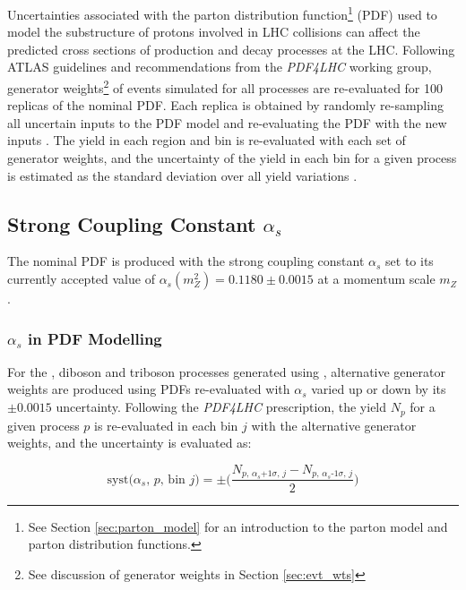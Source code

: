 Uncertainties associated with the parton distribution function\footnote{See Section \ref{sec:parton_model} for an introduction to the parton model and parton distribution functions.} (PDF) used to model the substructure of protons involved in LHC collisions can affect the predicted cross sections of production and decay processes at the LHC. Following ATLAS guidelines and recommendations from the \textit{PDF4LHC} \cite{PDF4LHC_recos_2016} working group, generator weights\footnote{See discussion of generator weights in Section \ref{sec:evt_wts}} of events simulated for all processes are re-evaluated for 100 replicas of the nominal PDF. Each replica is obtained by randomly re-sampling all uncertain inputs to the PDF model and re-evaluating the PDF with the new inputs \cite{BALL20091}. The yield in each region and bin is re-evaluated with each set of generator weights, and the uncertainty of the yield in each bin for a given process is estimated as the standard deviation over all yield variations \cite{PDF4LHC_recos_2016}.

\subsection{Strong Coupling Constant \(\alpha_s\)}

The nominal PDF is produced with the strong coupling constant \(\alpha_s\) set to its currently accepted value of \(\alpha_s(m_Z^2)=0.1180\pm0.0015\) \cite{PDF4LHC_recos_2016} at a momentum scale \(m_Z\). 

\subsubsection{\(\alpha_s\) in PDF Modelling}

For the \wjets, diboson and triboson processes generated using , alternative generator weights are produced using PDFs re-evaluated with \(\alpha_s\) varied up or down by its \(\pm0.0015\) uncertainty. Following the \textit{PDF4LHC} prescription, the yield \(N_p\) for a given process \(p\) is re-evaluated in each bin \(j\) with the alternative generator weights, and the uncertainty is evaluated as:

\begin{equation}
\label{eq:alphas_syst}
\text{syst}\text{(\(\alpha_s\), \(p\), bin \(j\))}= \pm\Bigg(\frac{N_\text{\(p\), \(\alpha_s\)+1\(\sigma\), \(j\)} - N_\text{\(p\), \(\alpha_s\)-1\(\sigma\), \(j\)} }{2}\Bigg)
\end{equation}

